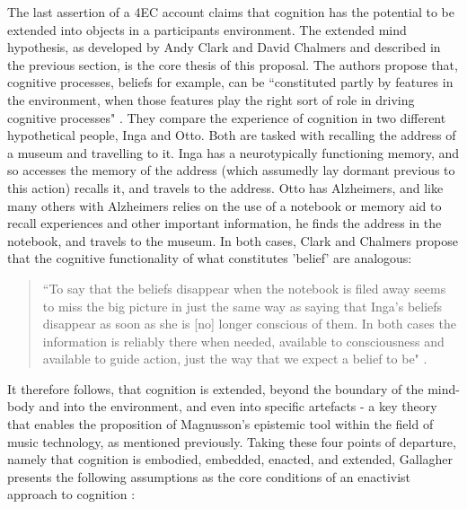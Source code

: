 The last assertion of a 4EC account claims that cognition has the potential to be extended into objects in a participants environment. The extended mind hypothesis, as developed by Andy Clark and David Chalmers and described in the previous section, is the core thesis of this proposal. The authors propose that, cognitive processes, beliefs for example, can be ``constituted partly by features in the environment, when those features play the right sort of role in driving cognitive processes" \citeyearpar[p. 12]{clark1998}. They compare the experience of cognition in two different hypothetical people, Inga and Otto. Both are tasked with recalling the address of a museum and travelling to it. Inga has a neurotypically functioning memory, and so accesses the memory of the address (which assumedly lay dormant previous to this action) recalls it, and travels to the address. Otto has Alzheimers, and like many others with Alzheimers relies on the use of a notebook or memory aid to recall experiences and other important information, he finds the address in the notebook, and travels to the museum. In both cases, Clark and Chalmers propose that the cognitive functionality of what constitutes 'belief' are analogous:
\begin{quote}
    ``To say that the beliefs disappear when the notebook is filed away seems to miss the big picture in just the same way as saying that Inga's beliefs disappear as soon as she is [no] longer conscious of them. In both cases the information is reliably there when needed, available to consciousness and available to guide action, just the way that we expect a belief to be" \citeyearpar[13]{clark1998}.
\end{quote}
It therefore follows, that cognition is extended, beyond the boundary of the mind-body and into the environment, and even into specific artefacts - a key theory that enables the proposition of Magnusson's epistemic tool within the field of music technology, as mentioned previously. Taking these four points of departure, namely that cognition is embodied, embedded, enacted, and extended, Gallagher presents the following assumptions as the core conditions of an enactivist approach to cognition \citep[p. 6]{gallagher2017}:
